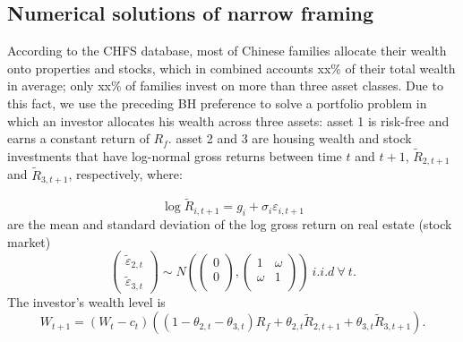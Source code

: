 \documentclass[ukenglish,nottitlepage,thmsb,11pt,letterpaper]{article}
\begin{document}
\subsection{Numerical solutions of narrow framing}
According to the CHFS database, most of Chinese families allocate their wealth onto properties and stocks, which in combined accounts  xx\% of their total wealth in average; only xx\% of families invest on more than three asset classes. Due to this fact, we use the preceding BH preference to solve a portfolio problem in which an investor allocates his wealth across three assets: asset 1 is risk-free and earns a constant return of $R_f$. asset 2 and 3 are housing wealth and stock investments that have log-normal gross returns between time $t$ and $t+1$, $\widetilde{R}_{2,t+1}$ and  $\widetilde{R}_{3,t+1}$, respectively, where:

\begin{equation*}
\log\widetilde{R}_{i,t+1} = g_i + \sigma_i \varepsilon_{i,t+1}
\end{equation*}
are the mean and standard deviation of the log gross return on real estate (stock market)
\begin{equation}
\left(
\begin{array}{ccc}
\widetilde{\varepsilon}_{2,t}\\
\widetilde{\varepsilon}_{3,t}
\end{array}
\right)
\sim N
\left( \left(
\begin{array}{ccc}
0\\
0\\
\end{array}
\right)
,
\left(
\begin{array}{ccc}
1 & \omega\\
\omega & 1\\
\end{array}
\right)  \right) \ i.i.d \ \forall \  t.
\end{equation}
The investor's wealth level is
\begin{equation}
W_{t+1} = (W_t -c_t) \left((1-\theta_{2,t} - \theta_{3,t}) R_f + \theta_{2,t} \widetilde{R}_{2,t+1} + \theta_{3,t}  \widetilde{R}_{3,t+1}\right).
\end{equation}
\end{document}

